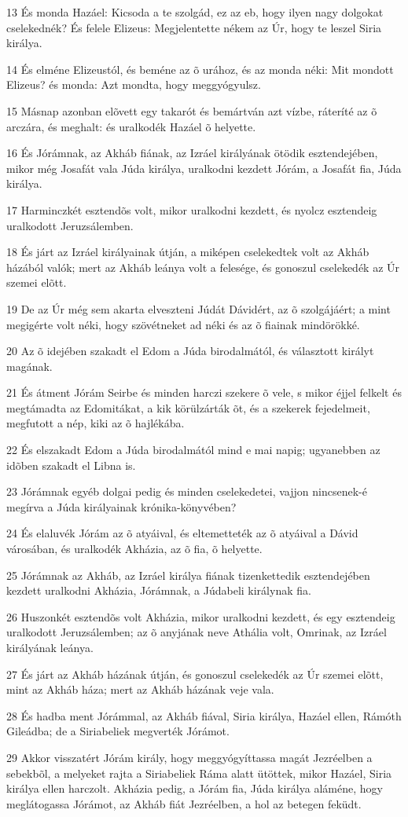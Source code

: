\par 13 És monda Hazáel: Kicsoda a te szolgád, ez az eb, hogy ilyen nagy dolgokat cselekednék? És felele Elizeus: Megjelentette nékem az Úr, hogy te leszel Siria királya.
\par 14 És elméne Elizeustól, és beméne az õ urához, és az monda néki: Mit mondott Elizeus? és monda: Azt mondta, hogy meggyógyulsz.
\par 15 Másnap azonban elõvett egy takarót és bemártván azt vízbe, ráteríté az õ arczára, és meghalt: és uralkodék Hazáel õ helyette.
\par 16 És Jórámnak, az Akháb fiának, az Izráel királyának ötödik esztendejében, mikor még Josafát vala Júda királya, uralkodni kezdett Jórám, a Josafát fia, Júda királya.
\par 17 Harminczkét esztendõs volt, mikor uralkodni kezdett, és nyolcz esztendeig uralkodott Jeruzsálemben.
\par 18 És járt az Izráel királyainak útján, a miképen cselekedtek volt az Akháb házából valók; mert az Akháb leánya volt a felesége, és gonoszul cselekedék az Úr szemei elõtt.
\par 19 De az Úr még sem akarta elveszteni Júdát Dávidért, az õ szolgájáért; a mint megigérte volt néki, hogy szövétneket ad néki és az õ fiainak mindörökké.
\par 20 Az õ idejében szakadt el Edom a Júda birodalmától, és választott királyt magának.
\par 21 És átment Jórám Seirbe és minden harczi szekere õ vele, s mikor éjjel felkelt és megtámadta az Edomitákat, a kik körülzárták õt, és a szekerek fejedelmeit, megfutott a nép, kiki az õ hajlékába.
\par 22 És elszakadt Edom a Júda birodalmától mind e mai napig; ugyanebben az idõben szakadt el Libna is.
\par 23 Jórámnak egyéb dolgai pedig és minden cselekedetei, vajjon nincsenek-é megírva a Júda királyainak krónika-könyvében?
\par 24 És elaluvék Jórám az õ atyáival, és eltemetteték az õ atyáival a Dávid városában, és uralkodék Akházia, az õ fia, õ helyette.
\par 25 Jórámnak az Akháb, az Izráel királya fiának tizenkettedik esztendejében kezdett uralkodni Akházia, Jórámnak, a Júdabeli királynak fia.
\par 26 Huszonkét esztendõs volt Akházia, mikor uralkodni kezdett, és egy esztendeig uralkodott Jeruzsálemben; az õ anyjának neve Athália volt, Omrinak, az Izráel királyának leánya.
\par 27 És járt az Akháb házának útján, és gonoszul cselekedék az Úr szemei elõtt, mint az Akháb háza; mert az Akháb házának veje vala.
\par 28 És hadba ment Jórámmal, az Akháb fiával, Siria királya, Hazáel ellen, Rámóth Gileádba; de a Siriabeliek megverték Jórámot.
\par 29 Akkor visszatért Jórám király, hogy meggyógyíttassa magát Jezréelben a sebekbõl, a melyeket rajta a Siriabeliek Ráma alatt ütöttek, mikor Hazáel, Siria királya ellen harczolt. Akházia pedig, a Jórám fia, Júda királya aláméne, hogy meglátogassa Jórámot, az Akháb fiát Jezréelben, a hol az betegen feküdt.

